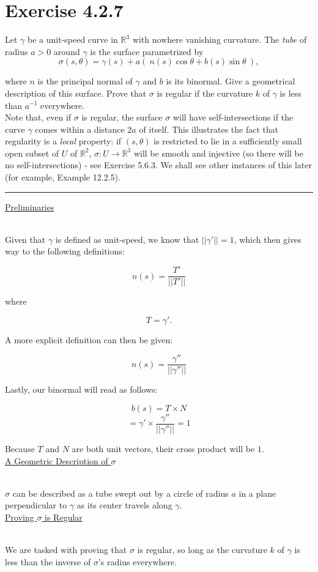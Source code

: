 \documentclass[12pt]{article}
\newcommand{\ulind}[1]
{
\noindent
\underline{#1}\\\\
\indent
}
\newcommand{\norm}[1]
{
||#1||
}
\begin{document}
\maketitle

\section*{Exercise 4.2.7}
\indent

Let $\gamma$ be a unit-speed curve in $\mathbb{R}^3$ with nowhere vanishing curvature. The \emph{tube} of radius $a > 0$ around $\gamma$ is the surface parametrized by
$$
\sigma(s,\theta) = \gamma(s) + a( \ n(s)\cos \theta + b(s) \sin \theta \ ),
$$

where $n$ is the principal normal of $\gamma$ and $b$ is its binormal. Give a geometrical description of this surface. Prove that $\sigma$ is regular if the curvature $k$ of $\gamma$ is less than $a^{-1}$ everywhere.\\

Note that, even if $\sigma$ is regular, the surface $\sigma$ will have self-intersections if the curve $\gamma$ comes within a distance $2a$ of itself. This illustrates the fact that regularity is a \emph{local} property: if $(s,\theta)$ is restricted to lie in a sufficiently small open subset of $U$ of $\mathbb{R}^2$, $\sigma : U \rightarrow \mathbb{R}^3$ will be smooth and injective (so there will be no self-intersections) - see Exercise 5.6.3. We shall see other instances of this later (for example, Example 12.2.5).

\vspace{1cm}
\hrule
\vspace{1cm}
\noindent

\ulind{Preliminaries}
Given that $\gamma$ is defined as unit-speed, we know that $\norm{\gamma'} = 1$, which then gives way to the following definitions:

$$
n(s) = \frac{T'}{\norm{T'}}
$$

where

$$
T = \gamma'.
$$

A more explicit definition can then be given:

$$
n(s) = \frac{\gamma''}{\norm{\gamma''}}
$$

\clearpage

Lastly, our binormal will read as follows:

$$
b(s) = T \times N
$$
$$
= \gamma' \times \frac{\gamma''}{\norm{\gamma''}} = 1
$$

Because $T$ and $N$ are both unit vectors, their cross product will be $1$.\\

\ulind{A Geometric Description of $\sigma$}
$\sigma$ can be described as a tube swept out by a circle of radius $a$ in a plane perpendicular to $\gamma$ as its center travels along $\gamma$. \\

\ulind{Proving $\sigma$ is Regular}
We are tasked with proving that $\sigma$ is regular, so long as the curvature $k$ of $\gamma$ is less than the inverse of $\sigma$'s radius everywhere.
\end{document}
